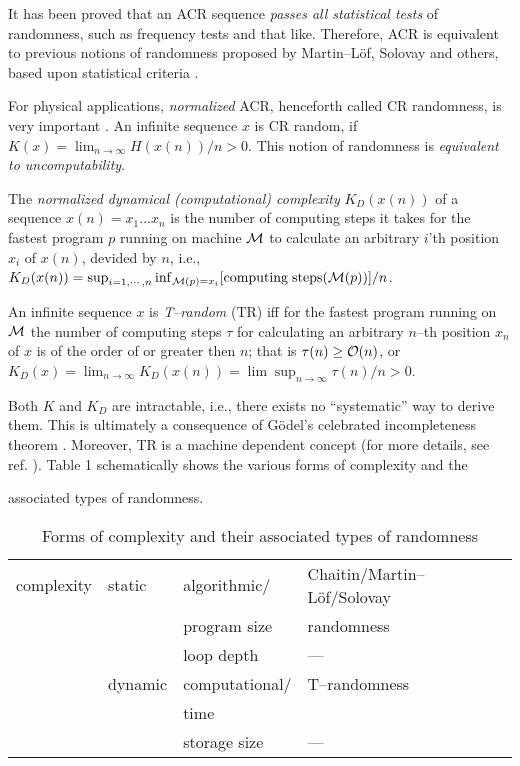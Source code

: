 It has been proved \cite{chaitin3} that an ACR sequence {\sl passes
all statistical tests} of randomness, such as frequency tests and that
like. Therefore, ACR is equivalent to previous notions of
randomness proposed by Martin--L\"of, Solovay and others, based upon
statistical criteria \cite{chaitin3,svozil1}.

For physical applications, {\sl normalized} ACR, henceforth called
CR randomness, is very important \cite{alekseev}.
An infinite sequence $x$ is  CR random, if
$K(x)=\lim_{n\rightarrow \infty } H(x(n))/n>0$.
This notion of randomness is {\sl equivalent to uncomputability}.

The {\sl normalized dynamical (computational) complexity}
$K_D(x(n))$
of a sequence $x(n)=x_1\ldots x_n$ is the number of computing steps
it
takes for the fastest program $p$ running on machine $\cal M$ to
calculate an arbitrary $i$'th position $x_i$ of $x(n)$, devided by $n$,
i.e.,\\
$K_D(x(n))=\sup_{i=1,\cdots ,n}\inf_{{\cal M}(p)=x_i} [{{\rm computing
\; steps}({\cal M} (p))]/ n}$.


An infinite sequence $x$ is {\em T--random}
(TR)
iff for the fastest program running on $\cal M$ the number of computing
steps $\tau
$ for calculating an arbitrary $n$--th position $x_n$ of $x$ is of the
order of or greater then $n$; that is $\tau (n)\ge {\cal O} (n)$, or
$K_D(x)=\lim_{n\rightarrow \infty}K_D(x(n))=\lim \sup_{n\rightarrow
\infty } {\tau (n)/ n}>0$.

Both $K$ and $K_D$ are intractable, i.e., there
exists no ``systematic'' way to derive them. This is
ultimately a consequence of G\"odel's celebrated incompleteness theorem
\cite{godel1,rogers1,calude1}.
Moreover, TR is a machine dependent concept
(for more details, see ref. \cite{svozil1}).
Table 1 schematically shows the various forms of complexity and the



associated types of randomness.
\begin{table}
\begin{tabular}{|l|l|l|l|} \hline
complexity & static & algorithmic/ & Chaitin/Martin--L\"of/Solovay \\
           &        & program size & randomness \\  \cline{3-4}
           &        & loop depth   &---\\ \cline{2-4}
           & dynamic & computational/ & T--randomness \\
           &         & time           &               \\ \cline{3-4}
           &         & storage size   &---         \\  \hline
\end{tabular}
\caption{Forms of complexity and their associated types of randomness}
\end{table}


